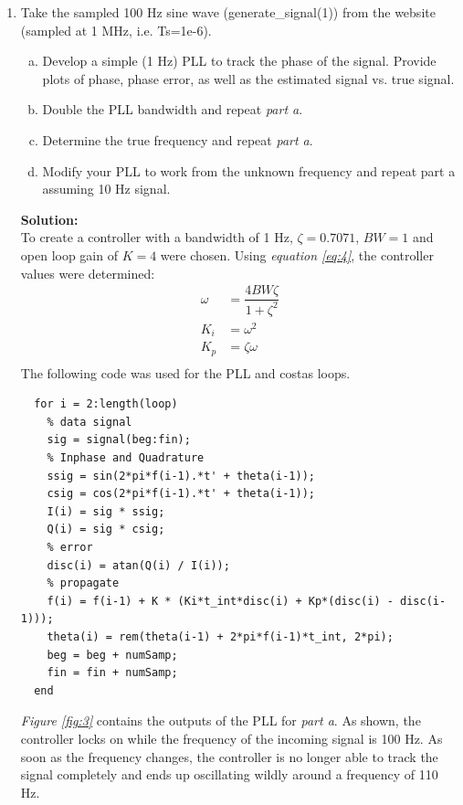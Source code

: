 \documentclass[10pt]{article}
\newcommand{\solution}{\textbf{Solution: \\}}
\begin{document}
\begin{enumerate}[label=\textbf{\arabic*.}]
  
  \item Take the sampled 100 Hz sine wave (generate\_signal(1)) from the website 
  (sampled at 1 MHz, i.e. Ts=1e-6).
  \begin{enumerate}[(a)]
    \itemsep -2pt
    \item Develop a simple (1 Hz) PLL to track the phase of the signal. Provide 
    plots of phase, phase error, as well as the estimated signal vs. true signal.
    \item Double the PLL bandwidth and repeat \emph{part a}.
    \item Determine the true frequency and repeat \emph{part a}.
    \item Modify your PLL to work from the unknown frequency and repeat part a 
    assuming 10 Hz signal.
  \end{enumerate}
  \solution
  To create a controller with a bandwidth of 1 Hz, $\zeta=0.7071$,  $BW = 1$ 
  and open loop gain of $K = 4$ were chosen. Using \emph{equation \ref{eq:4}}, 
  the controller values were determined:
  \begin{equation}
    \begin{split}
      \omega &= \dfrac{4 BW \zeta}{1+\zeta^2} \\
      K_i &= \omega ^2 \\
      K_p &= \zeta \omega \\
    \end{split}
  \end{equation}
  The following code was used for the PLL and costas loops. 
  \begin{lstlisting}
  for i = 2:length(loop)
    % data signal
    sig = signal(beg:fin);
    % Inphase and Quadrature
    ssig = sin(2*pi*f(i-1).*t' + theta(i-1));
    csig = cos(2*pi*f(i-1).*t' + theta(i-1));
    I(i) = sig * ssig;
    Q(i) = sig * csig;
    % error
    disc(i) = atan(Q(i) / I(i));
    % propagate
    f(i) = f(i-1) + K * (Ki*t_int*disc(i) + Kp*(disc(i) - disc(i-1)));
    theta(i) = rem(theta(i-1) + 2*pi*f(i-1)*t_int, 2*pi);
    beg = beg + numSamp;
    fin = fin + numSamp;
  end
  \end{lstlisting}
  \emph{Figure \ref{fig:3}} contains the outputs of the PLL for \emph{part a}. 
  As shown, the controller locks on while the frequency of the incoming signal 
  is 100 Hz. As soon as the frequency changes, the controller is no longer able 
  to track the signal completely and ends up oscillating wildly around a 
  frequency of 110 Hz.
  \begin{figure}[H]
    \centering

\end{figure}
\end{enumerate}
\end{document}
